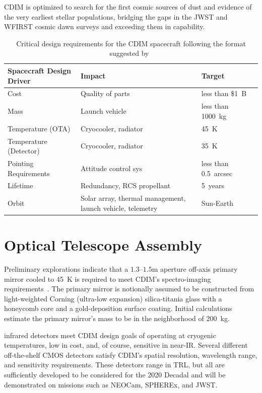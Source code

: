 \documentclass{ws-jai}
\begin{document}
CDIM is optimized to search for the first cosmic sources of dust and evidence of the very earliest stellar populations, bridging the gaps in the JWST and WFIRST cosmic dawn surveys and exceeding them in capability.

\begin{table}
  \caption{Critical design requirements for the CDIM spacecraft following the format suggested by~\citeauthor{smad2015}}
  \small\centering
  \begin{tabular}{@{}llll@{}} \toprule
    Spacecraft Design Driver & Impact & Target \\ \midrule
    Cost & Quality of parts & less than \$\SI{1}{B} \\
    Mass & Launch vehicle & less than \SI{1000}{\kilo\gram} \\
    Temperature (OTA) & Cryocooler, radiator & \SI{45}{\kelvin} \\
    Temperature (Detector) & Cryocooler, radiator & \SI{35}{\kelvin} \\
    Pointing Requirements & Attitude control sys & less than \SI{0.5}{arcsec} \\
    Lifetime & Redundancy, RCS propellant & \SI{5}{years} \\
    Orbit & Solar array, thermal management, launch vehicle, telemetry & Sun-Earth \Ltwo{} \\
    \bottomrule
  \end{tabular}
\label{tab:critical-params}
\end{table}

\section{Optical Telescope Assembly}
\label{sec:ota}
Preliminary explorations indicate that a $1.3$--$1.5$\si{\meter} aperture off-axis primary mirror cooled to \SI{45}{\kelvin} is required to meet CDIM's spectro-imaging  requirements~\cite{cooray2016cdim2page}.
The primary mirror is notionally assumed to be constructed from light-weighted Corning (ultra-low expansion) silica-titania glass with a honeycomb core and a gold-deposition surface coating.
Initial calculations estimate the primary mirror's mass to be in the neighborhood of \SI{200}{\kilo\gram}.

 infrared detectors meet CDIM design goals of operating at cryogenic temperatures, low in cost, and, of course, sensitive in near-IR.\@
Several different off-the-shelf CMOS detectors satisfy CDIM's spatial resolution, wavelength range, and sensitivity requirements.
These detectors range in TRL, but all are sufficiently developed to be considered for the 2020 Decadal and will be demonstrated on missions such as NEOCam, SPHEREx, and JWST\@. 
\end{document}
